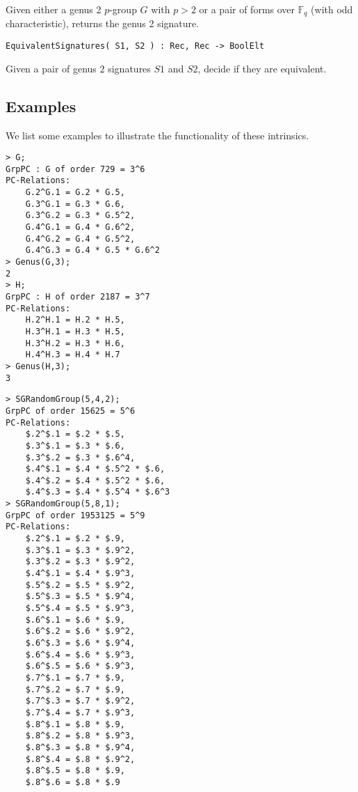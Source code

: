 \documentclass{amsart}
\begin{document}
\color{black}
Given either a genus 2 $p$-group $G$ with $p>2$ or a pair of forms over $\mathbb{F}_q$ (with odd characteristic), returns the genus 2 signature.

\color{blue}
\begin{verbatim}
EquivalentSignatures( S1, S2 ) : Rec, Rec -> BoolElt
\end{verbatim}

\color{black}
Given a pair of genus 2 signatures $S1$ and $S2$, decide if they are equivalent.

\subsection{Examples}
We list some examples to illustrate the functionality of these intrinsics.

\begin{lstlisting}[frame=single,basicstyle=\ttfamily\color{black!30!teal},backgroundcolor=\color{white!70!gray}]
> G;
GrpPC : G of order 729 = 3^6
PC-Relations:
    G.2^G.1 = G.2 * G.5, 
    G.3^G.1 = G.3 * G.6, 
    G.3^G.2 = G.3 * G.5^2, 
    G.4^G.1 = G.4 * G.6^2, 
    G.4^G.2 = G.4 * G.5^2, 
    G.4^G.3 = G.4 * G.5 * G.6^2
> Genus(G,3);
2
> H;
GrpPC : H of order 2187 = 3^7
PC-Relations:
    H.2^H.1 = H.2 * H.5, 
    H.3^H.1 = H.3 * H.5, 
    H.3^H.2 = H.3 * H.6, 
    H.4^H.3 = H.4 * H.7
> Genus(H,3);
3
\end{lstlisting}

\begin{lstlisting}[frame=single,basicstyle=\ttfamily\color{black!30!teal},backgroundcolor=\color{white!70!gray}]
> SGRandomGroup(5,4,2);                        
GrpPC of order 15625 = 5^6
PC-Relations:
    $.2^$.1 = $.2 * $.5, 
    $.3^$.1 = $.3 * $.6, 
    $.3^$.2 = $.3 * $.6^4, 
    $.4^$.1 = $.4 * $.5^2 * $.6, 
    $.4^$.2 = $.4 * $.5^2 * $.6, 
    $.4^$.3 = $.4 * $.5^4 * $.6^3
> SGRandomGroup(5,8,1);
GrpPC of order 1953125 = 5^9
PC-Relations:
    $.2^$.1 = $.2 * $.9, 
    $.3^$.1 = $.3 * $.9^2, 
    $.3^$.2 = $.3 * $.9^2, 
    $.4^$.1 = $.4 * $.9^3, 
    $.5^$.2 = $.5 * $.9^2, 
    $.5^$.3 = $.5 * $.9^4, 
    $.5^$.4 = $.5 * $.9^3, 
    $.6^$.1 = $.6 * $.9, 
    $.6^$.2 = $.6 * $.9^2, 
    $.6^$.3 = $.6 * $.9^4, 
    $.6^$.4 = $.6 * $.9^3, 
    $.6^$.5 = $.6 * $.9^3, 
    $.7^$.1 = $.7 * $.9, 
    $.7^$.2 = $.7 * $.9, 
    $.7^$.3 = $.7 * $.9^2, 
    $.7^$.4 = $.7 * $.9^3, 
    $.8^$.1 = $.8 * $.9, 
    $.8^$.2 = $.8 * $.9^3, 
    $.8^$.3 = $.8 * $.9^4, 
    $.8^$.4 = $.8 * $.9^2, 
    $.8^$.5 = $.8 * $.9, 
    $.8^$.6 = $.8 * $.9
\end{lstlisting}
\end{document}

